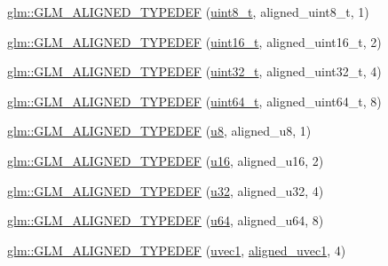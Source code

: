 \begin{DoxyCompactItemize}
\item 
\hyperlink{group__gtx__type__aligned_gaf6ced36f13bae57f377bafa6f5fcc299}{glm\+::\+G\+L\+M\+\_\+\+A\+L\+I\+G\+N\+E\+D\+\_\+\+T\+Y\+P\+E\+D\+EF} (\hyperlink{group__gtc__type__precision_ga93adf6dd9803408f3e3aaf9dedda352b}{uint8\+\_\+t}, aligned\+\_\+uint8\+\_\+t, 1)
\item 
\hyperlink{group__gtx__type__aligned_gafbc7fb7847bfc78a339d1d371c915c73}{glm\+::\+G\+L\+M\+\_\+\+A\+L\+I\+G\+N\+E\+D\+\_\+\+T\+Y\+P\+E\+D\+EF} (\hyperlink{group__gtc__type__precision_gac4eb4f43cae8129b00086dc234d3b8fc}{uint16\+\_\+t}, aligned\+\_\+uint16\+\_\+t, 2)
\item 
\hyperlink{group__gtx__type__aligned_gaa86bc56a73fd8120b1121b5f5e6245ae}{glm\+::\+G\+L\+M\+\_\+\+A\+L\+I\+G\+N\+E\+D\+\_\+\+T\+Y\+P\+E\+D\+EF} (\hyperlink{group__gtc__type__precision_ga822ca53a9ad412504532838906276a99}{uint32\+\_\+t}, aligned\+\_\+uint32\+\_\+t, 4)
\item 
\hyperlink{group__gtx__type__aligned_ga68c0b9e669060d0eb5ab8c3ddeb483d8}{glm\+::\+G\+L\+M\+\_\+\+A\+L\+I\+G\+N\+E\+D\+\_\+\+T\+Y\+P\+E\+D\+EF} (\hyperlink{group__gtc__type__precision_ga058f57c19e1befdcf12498944bd73e69}{uint64\+\_\+t}, aligned\+\_\+uint64\+\_\+t, 8)
\item 
\hyperlink{group__gtx__type__aligned_ga4f3bab577daf3343e99cc005134bce86}{glm\+::\+G\+L\+M\+\_\+\+A\+L\+I\+G\+N\+E\+D\+\_\+\+T\+Y\+P\+E\+D\+EF} (\hyperlink{group__gtc__type__precision_ga5e3dc67373d5068997d2d9f41c9024d2}{u8}, aligned\+\_\+u8, 1)
\item 
\hyperlink{group__gtx__type__aligned_ga13a2391339d0790d43b76d00a7611c4f}{glm\+::\+G\+L\+M\+\_\+\+A\+L\+I\+G\+N\+E\+D\+\_\+\+T\+Y\+P\+E\+D\+EF} (\hyperlink{group__gtc__type__precision_gae7a1571503f83d2264ddfa705a6b082a}{u16}, aligned\+\_\+u16, 2)
\item 
\hyperlink{group__gtx__type__aligned_ga197570e03acbc3d18ab698e342971e8f}{glm\+::\+G\+L\+M\+\_\+\+A\+L\+I\+G\+N\+E\+D\+\_\+\+T\+Y\+P\+E\+D\+EF} (\hyperlink{group__gtc__type__precision_ga54e837745059fd29017bed71cfa0a8db}{u32}, aligned\+\_\+u32, 4)
\item 
\hyperlink{group__gtx__type__aligned_ga0f033b21e145a1faa32c62ede5878993}{glm\+::\+G\+L\+M\+\_\+\+A\+L\+I\+G\+N\+E\+D\+\_\+\+T\+Y\+P\+E\+D\+EF} (\hyperlink{group__gtc__type__precision_ga71cedd4972f9cb1a5e14dfe5ab83ecd7}{u64}, aligned\+\_\+u64, 8)
\item 
\hyperlink{group__gtx__type__aligned_ga509af83527f5cd512e9a7873590663aa}{glm\+::\+G\+L\+M\+\_\+\+A\+L\+I\+G\+N\+E\+D\+\_\+\+T\+Y\+P\+E\+D\+EF} (\hyperlink{vec1_8hpp_a4e12bc23a3d060164eef452f81d92a03}{uvec1}, \hyperlink{group__gtc__type__aligned_gab0fbe9830a7129d9135b558b30eed930}{aligned\+\_\+uvec1}, 4)

\end{DoxyCompactItemize}
